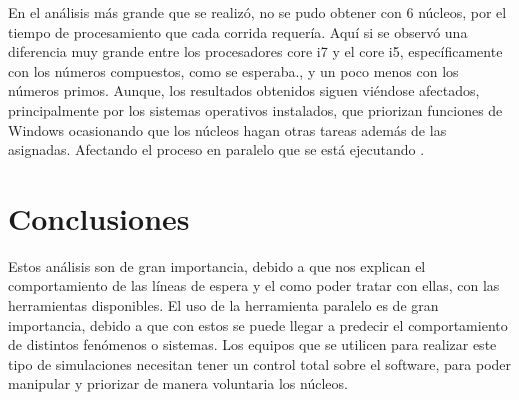 \documentclass{article}
\begin{document}
 
En el análisis más grande que se realizó, no se pudo obtener con 6 núcleos, por el tiempo de procesamiento que cada corrida requería. Aquí si se observó una diferencia muy grande entre los procesadores core i7 y el core i5, específicamente con los números compuestos, como se esperaba., y un poco menos con los números primos. Aunque, los resultados obtenidos siguen viéndose afectados, principalmente por los sistemas operativos instalados, que priorizan funciones de Windows ocasionando que los núcleos hagan otras tareas además de las asignadas. Afectando el proceso en paralelo que se está ejecutando \cite{REF5}.

\vfill

\section{Conclusiones}
Estos análisis son de gran importancia, debido a que nos explican el comportamiento de las líneas de espera y el como poder tratar con ellas, con las herramientas disponibles.
El uso de la herramienta paralelo es de gran importancia, debido a que con estos se puede llegar a predecir el comportamiento de distintos fenómenos o sistemas.
Los equipos que se utilicen para realizar este tipo de simulaciones necesitan tener un control total sobre el software, para poder manipular y priorizar de manera voluntaria los núcleos.



\end{document}
